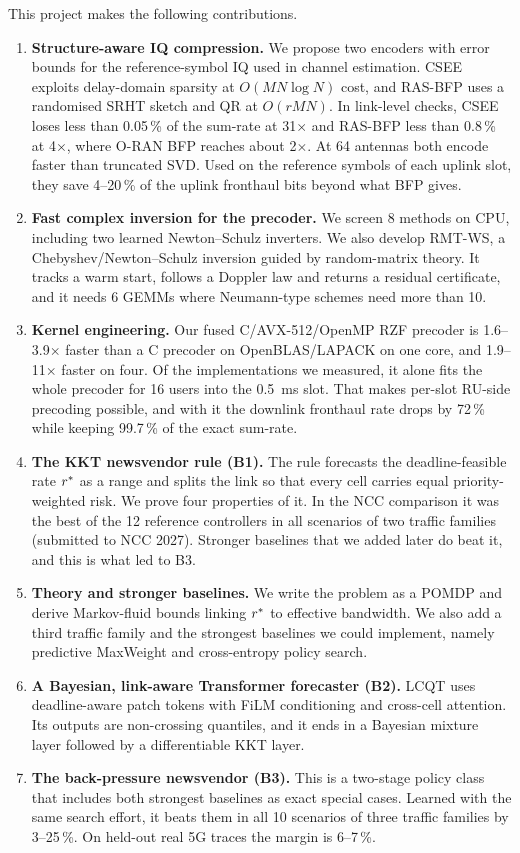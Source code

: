 This project makes the following contributions.
\begin{enumerate}
  \item \textbf{Structure-aware IQ compression.} We propose two encoders with error bounds for the reference-symbol IQ used in channel estimation. CSEE exploits delay-domain sparsity at $O(MN\log N)$ cost, and RAS-BFP uses a randomised SRHT sketch and QR at $O(rMN)$. In link-level checks, CSEE loses less than 0.05\,\% of the sum-rate at 31$\times$ and RAS-BFP less than 0.8\,\% at 4$\times$, where O-RAN BFP reaches about 2$\times$. At 64 antennas both encode faster than truncated SVD. Used on the reference symbols of each uplink slot, they save 4--20\,\% of the uplink fronthaul bits beyond what BFP gives.
  \item \textbf{Fast complex inversion for the precoder.} We screen 8 methods on CPU, including two learned Newton--Schulz inverters. We also develop RMT-WS, a Chebyshev/Newton--Schulz inversion guided by random-matrix theory. It tracks a warm start, follows a Doppler law and returns a residual certificate, and it needs 6 GEMMs where Neumann-type schemes need more than 10.
  \item \textbf{Kernel engineering.} Our fused C/AVX-512/OpenMP RZF precoder is 1.6--3.9$\times$ faster than a C precoder on OpenBLAS/LAPACK on one core, and 1.9--11$\times$ faster on four. Of the implementations we measured, it alone fits the whole precoder for 16 users into the 0.5~ms slot. That makes per-slot RU-side precoding possible, and with it the downlink fronthaul rate drops by 72\,\% while keeping 99.7\,\% of the exact sum-rate.
  \item \textbf{The KKT newsvendor rule (B1).} The rule forecasts the deadline-feasible rate $r^{\ast}$ as a range and splits the link so that every cell carries equal priority-weighted risk. We prove four properties of it. In the NCC comparison it was the best of the 12 reference controllers in all scenarios of two traffic families (submitted to NCC 2027). Stronger baselines that we added later do beat it, and this is what led to B3.
  \item \textbf{Theory and stronger baselines.} We write the problem as a POMDP and derive Markov-fluid bounds linking $r^{\ast}$ to effective bandwidth. We also add a third traffic family and the strongest baselines we could implement, namely predictive MaxWeight and cross-entropy policy search.
  \item \textbf{A Bayesian, link-aware Transformer forecaster (B2).} LCQT uses deadline-aware patch tokens with FiLM conditioning and cross-cell attention. Its outputs are non-crossing quantiles, and it ends in a Bayesian mixture layer followed by a differentiable KKT layer.
  \item \textbf{The back-pressure newsvendor (B3).} This is a two-stage policy class that includes both strongest baselines as exact special cases. Learned with the same search effort, it beats them in all 10 scenarios of three traffic families by 3--25\,\%. On held-out real 5G traces the margin is 6--7\,\%.
\end{enumerate}

